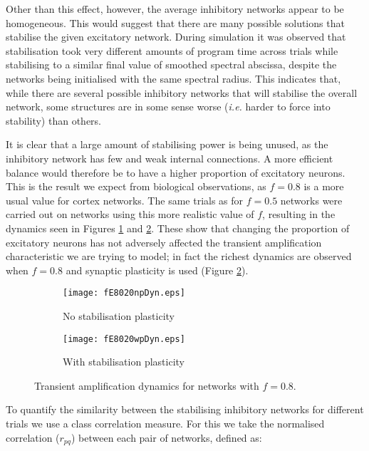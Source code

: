 \documentclass[12pt, a4paper]{article}
\begin{document}
\FloatBarrier

Other than this effect, however, the average inhibitory networks appear to be homogeneous.  This would suggest that there are many possible solutions that stabilise the given excitatory network.  During simulation it was observed that stabilisation took very different amounts of program time across trials while stabilising to a similar final value of smoothed spectral abscissa, despite the networks being initialised with the same spectral radius.  This indicates that, while there are several possible inhibitory networks that will stabilise the overall network, some structures are in some sense worse (\emph{i.e.} harder to force into stability) than others.

It is clear that a large amount of stabilising power is being unused, as the inhibitory network has few and weak  internal connections.  A more efficient balance would therefore be to have a higher proportion of excitatory neurons.  This is the result we expect from biological observations, as $f=0.8$ is a more usual value for cortex networks.  The same trials as for $f=0.5$ networks were carried out on networks using this more realistic value of $f$, resulting in the dynamics seen in Figures \ref{fig:8020npDyn} and \ref{fig:8020wpDyn}.  These show that changing the proportion of excitatory neurons has not adversely affected the transient amplification characteristic we are trying to model; in fact the richest dynamics are observed when $f=0.8$ and synaptic plasticity is used (Figure \ref{fig:8020wpDyn}).

\begin{figure}[Thb]
   \begin{subfigure}{0.5\linewidth}   
      \texttt{[image: fE8020npDyn.eps]}
      \caption{No stabilisation plasticity}
      \label{fig:8020npDyn}
   \end{subfigure}
   \hspace{\fill}   %
   \begin{subfigure}{0.5\linewidth}
      \texttt{[image: fE8020wpDyn.eps]}
      \caption{With stabilisation plasticity}
      \label{fig:8020wpDyn}
   \end{subfigure}
   \caption{Transient amplification dynamics for networks with $f=0.8$.}
    \label{fig:5050dyn}
\end{figure}


To quantify the similarity between the stabilising inhibitory networks for different trials we use a class correlation measure.  For this we take the normalised correlation ($r_{pq}$) between each pair of networks, defined as:
\end{document}
